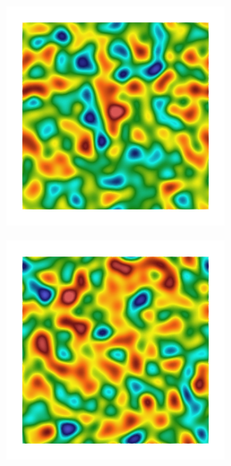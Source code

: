 \begin{frame}
  \vspace{-1.5em}
  \begin{columns}[T]
    \begin{column}{0.6\textwidth}
      \vspace{-1em}
      \begin{figure}
        \centering
        \begin{subfigure}{0.32\linewidth}
          \centering
          \includegraphics[width=0.8\textwidth]{Chapter345/figures/Gc_sqexp_cartesian_5_5_rho_0_seed_a}
        \end{subfigure}
        \begin{subfigure}{0.32\linewidth}
          \centering
          \includegraphics[width=0.8\textwidth]{Chapter345/figures/psic_sqexp_cartesian_5_5_rho_0_seed_a}

\end{subfigure}
\end{figure}
\end{column}
\end{columns}
\end{frame}
